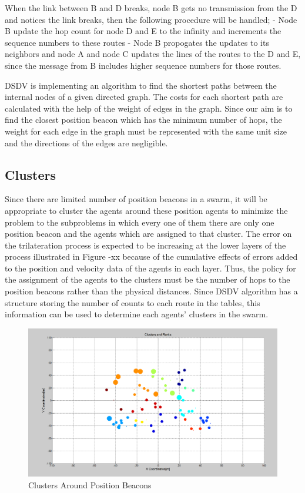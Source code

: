 When the link between B and D breaks, node B gets no transmission from the D and notices the link breaks, then the following procedure will be handled; \newline
	- Node B update the hop count for node D and E to the infinity and increments the sequence numbers to these routes \newline
	- Node B propogates the updates to its neighbors and node A and node C updates the lines of the routes to the D and E, since the message from B includes higher sequence numbers for those routes.
	
DSDV is implementing an algorithm to find the shortest paths between the internal nodes of a given directed graph. The costs for each shortest path are calculated with the help of the weight of edges in the graph. Since our aim is to find the closest position beacon which has the minimum number of hops, the weight for each edge in the graph must be represented with the same unit size and the directions of the edges are negligible. 

\subsection{Clusters}
Since there are limited number of position beacons in a swarm, it will be appropriate to cluster the agents around these position agents to minimize the problem to the subproblems in which every one of them there are only one position beacon and the agents which are assigned to that cluster. The error on the trilateration process is expected to be increasing at the lower layers of the process illustrated in Figure -xx because of the cumulative effects of errors added to the position and velocity data of the agents in each layer. Thus, the policy for the assignment of the agents to the clusters must be the number of hops to the position beacons rather than the physical distances. Since DSDV algorithm has a structure storing the number of counts to each route in the tables, this information can be used to determine each agents' clusters in the swarm. 

\begin{figure}[H]
\caption{Clusters Around Position Beacons} \label{Clusters_Ranks_2_ref}
\centering
\includegraphics[scale = 0.35]{Clusters_Ranks_2}
\end{figure}

